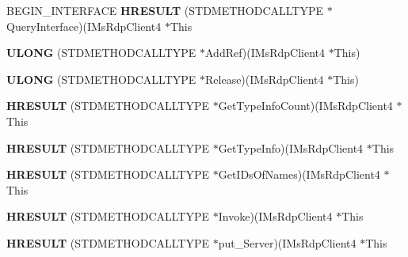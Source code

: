 \begin{DoxyCompactItemize}
\mbox{\label{struct_i_ms_rdp_client4_vtbl_afbf1f5f136e9af4f633984da07abec4c}} 
B\+E\+G\+I\+N\+\_\+\+I\+N\+T\+E\+R\+F\+A\+CE {\bfseries H\+R\+E\+S\+U\+LT} (S\+T\+D\+M\+E\+T\+H\+O\+D\+C\+A\+L\+L\+T\+Y\+PE $\ast$Query\+Interface)(I\+Ms\+Rdp\+Client4 $\ast$This
\item 
\mbox{\label{struct_i_ms_rdp_client4_vtbl_aa5dfd27a5eaf417ff566a957c721f5bb}} 
{\bfseries U\+L\+O\+NG} (S\+T\+D\+M\+E\+T\+H\+O\+D\+C\+A\+L\+L\+T\+Y\+PE $\ast$Add\+Ref)(I\+Ms\+Rdp\+Client4 $\ast$This)
\item 
\mbox{\label{struct_i_ms_rdp_client4_vtbl_a69b87797b1ff9b4fd0d80cdd1b91ac7f}} 
{\bfseries U\+L\+O\+NG} (S\+T\+D\+M\+E\+T\+H\+O\+D\+C\+A\+L\+L\+T\+Y\+PE $\ast$Release)(I\+Ms\+Rdp\+Client4 $\ast$This)
\item 
\mbox{\label{struct_i_ms_rdp_client4_vtbl_a38a03f3ded0988a97277b0de9244c8fb}} 
{\bfseries H\+R\+E\+S\+U\+LT} (S\+T\+D\+M\+E\+T\+H\+O\+D\+C\+A\+L\+L\+T\+Y\+PE $\ast$Get\+Type\+Info\+Count)(I\+Ms\+Rdp\+Client4 $\ast$This
\item 
\mbox{\label{struct_i_ms_rdp_client4_vtbl_a3d17bc935c606884aa46b083a728226e}} 
{\bfseries H\+R\+E\+S\+U\+LT} (S\+T\+D\+M\+E\+T\+H\+O\+D\+C\+A\+L\+L\+T\+Y\+PE $\ast$Get\+Type\+Info)(I\+Ms\+Rdp\+Client4 $\ast$This
\item 
\mbox{\label{struct_i_ms_rdp_client4_vtbl_aa30ee8d59b866b4db2f1afb2d6edbd59}} 
{\bfseries H\+R\+E\+S\+U\+LT} (S\+T\+D\+M\+E\+T\+H\+O\+D\+C\+A\+L\+L\+T\+Y\+PE $\ast$Get\+I\+Ds\+Of\+Names)(I\+Ms\+Rdp\+Client4 $\ast$This
\item 
\mbox{\label{struct_i_ms_rdp_client4_vtbl_a5ed5c44657fe01e5ff5f15e66b521964}} 
{\bfseries H\+R\+E\+S\+U\+LT} (S\+T\+D\+M\+E\+T\+H\+O\+D\+C\+A\+L\+L\+T\+Y\+PE $\ast$Invoke)(I\+Ms\+Rdp\+Client4 $\ast$This
\item 
\mbox{\label{struct_i_ms_rdp_client4_vtbl_a7c030ad62989d33535308bc91c15fb70}} 
{\bfseries H\+R\+E\+S\+U\+LT} (S\+T\+D\+M\+E\+T\+H\+O\+D\+C\+A\+L\+L\+T\+Y\+PE $\ast$put\+\_\+\+Server)(I\+Ms\+Rdp\+Client4 $\ast$This

\end{DoxyCompactItemize}
